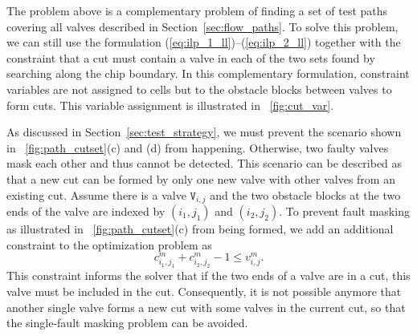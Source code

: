 The problem above is a complementary problem of finding a set of test paths
covering all valves described in Section~\ref{sec:flow_paths}.  To solve this
problem, we can still use the formulation
(\ref{eq:ilp_1_ll})--(\ref{eq:ilp_2_ll})
together with the constraint that a cut must contain a valve in each of the
two sets found by searching along the chip boundary. 
In this complementary formulation, constraint variables are not assigned to cells 
but to the obstacle blocks between valves to form cuts.
This variable assignment is illustrated in \figname~\ref{fig:cut_var}.

%
  
As discussed in Section~\ref{sec:test_strategy}, we must prevent the
scenario shown in \figname~\ref{fig:path_cutset}(c) and (d) from happening.
 Otherwise, two faulty valves mask each other and thus 
cannot be detected.  This scenario can be described as that a new
cut can be formed by only one new valve with other valves from an existing 
cut.  Assume there is a valve $\mathtt{V}_{i,j}$ and
the two obstacle blocks at the two ends of the valve are indexed by $(i_1,j_1)$ and
$(i_2,j_2)$.  To prevent fault masking as illustrated in \figname~\ref{fig:path_cutset}(c)
from being formed, we add an additional constraint to the optimization problem
as 
\begin{equation}
c^m_{i_1,j_1}+c^m_{i_2,j_2}-1\le v^m_{i,j}.
\end{equation}
This constraint informs the solver that if the two ends of a valve are in 
a cut, this valve must be included in the cut. 
Consequently, it is not possible anymore that another single valve forms a new cut
with some valves in the current cut, so that the single-fault masking problem
can be avoided. 

